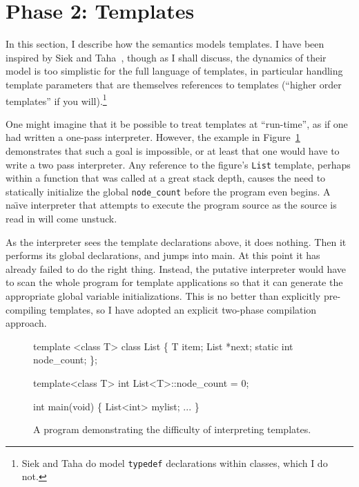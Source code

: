 \documentclass[11pt]{article}
\newcommand{\naive}{na\"\i{}ve}
\begin{document}
\section{Phase 2: Templates}
\label{sec:templates}

In this section, I describe how the semantics models templates.  I
have been inspired by Siek and Taha~\cite{DBLP:conf/ecoop/SiekT06},
though as I shall discuss, the dynamics of their model is too
simplistic for the full language of templates, in particular handling
template parameters that are themselves references to templates
(``higher order templates'' if you will).\footnote{Siek and Taha do
  model \texttt{typedef} declarations within classes, which I do not.}

One might imagine that it be possible to treat templates at
``run-time'', as if one had written a one-pass \cpp{} interpreter.
However, the example in Figure~\ref{fig:templates-not-interpretable}
demonstrates that such a goal is impossible, or at least that one
would have to write a two pass interpreter.  Any reference to the
figure's \texttt{List} template, perhaps within a function that was
called at a great stack depth, causes the need to statically
initialize the global \texttt{node\_count} before the program even
begins.  A \naive{} interpreter that attempts to execute the program
source as the source is read in will come unstuck.

As the interpreter sees the template declarations above, it does
nothing.  Then it performs its global declarations, and jumps into
main.  At this point it has already failed to do the right thing.
Instead, the putative interpreter would have to scan the whole program
for template applications so that it can generate the appropriate
global variable initializations.  This is no better than explicitly
pre-compiling templates, so I have adopted an explicit two-phase
compilation approach.

\begin{figure}
\begin{stdrule}
  template <class T> class List \{
    T item;
    List *next;
    static int node_count;
  \};

  template<class T> int List<T>::node_count = 0;

  int main(void)
  \{
    List<int> mylist;
    ...
  \}
\end{stdrule}
  \caption[A Difficult Program for Template Interpretation]{A program
    demonstrating the difficulty of interpreting templates.}
\label{fig:templates-not-interpretable}
\end{figure}
\end{document}
